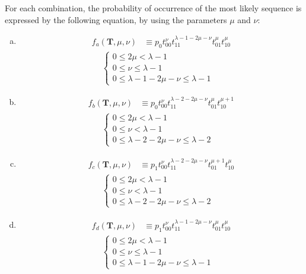﻿\documentclass[a4paper,xelatex,english]{bxjsarticle}
\newcommand\mib[1]{\boldsymbol{#1}}
\begin{document}
For each combination, the probability of occurrence of the most likely sequence is expressed by the following equation, by using the parameters $\mu$ and $\nu$:
\begin{enumerate}[a)]
	\item 
	\begin{align}
		f_{a}(\mib{T}, \mu, \nu) & \equiv p_{0} t_{00}^{\nu} t_{11}^{\lambda - 1 - 2\mu - \nu} t_{01}^{\mu} t_{10}^{\mu} 
	\end{align}
	\begin{align}
	\begin{cases}
		0 \leq 2 \mu < \lambda - 1 & \\
		0 \leq \nu \leq \lambda - 1 & \\
		0 \leq \lambda - 1 - 2\mu - \nu \leq \lambda - 1
	\end{cases}
	\label{eq:fa}
	\end{align}
	\item 
	\begin{align}
		f_{b}(\mib{T}, \mu, \nu) & \equiv p_{0} t_{00}^{\nu} t_{11}^{\lambda - 2 - 2\mu - \nu} t_{01}^{\mu} t_{10}^{\mu + 1} 
	\end{align}
	\begin{align}
	\begin{cases}
		0 \leq 2 \mu < \lambda - 1 & \\
		0 \leq \nu < \lambda - 1 & \\
		0 \leq \lambda - 2 - 2\mu - \nu \leq \lambda - 2
	\end{cases}
	\label{eq:fb}
	\end{align}
	\item 
	\begin{align}
		f_{c}(\mib{T}, \mu, \nu) & \equiv p_{1} t_{00}^{\nu} t_{11}^{\lambda - 2 - 2\mu - \nu} t_{01}^{\mu + 1} t_{10}^{\mu} 
	\end{align}
	\begin{align}
	\begin{cases}
		0 \leq 2 \mu < \lambda - 1 & \\
		0 \leq \nu < \lambda - 1 & \\
		0 \leq \lambda - 2 - 2\mu - \nu \leq \lambda - 2
	\end{cases}
	\label{eq:fc}
	\end{align}
	\item 
	\begin{align}
		f_{d}(\mib{T}, \mu, \nu) & \equiv p_{1} t_{00}^{\nu} t_{11}^{\lambda - 1 - 2\mu - \nu} t_{01}^{\mu} t_{10}^{\mu} 
	\end{align}
	\begin{align}
	\begin{cases}
		0 \leq 2 \mu < \lambda - 1 & \\
		0 \leq \nu \leq \lambda - 1 & \\
		0 \leq \lambda - 1 - 2\mu - \nu \leq \lambda - 1
	\end{cases}
	\label{eq:fd}
	\end{align}
\end{enumerate}
\end{document}
